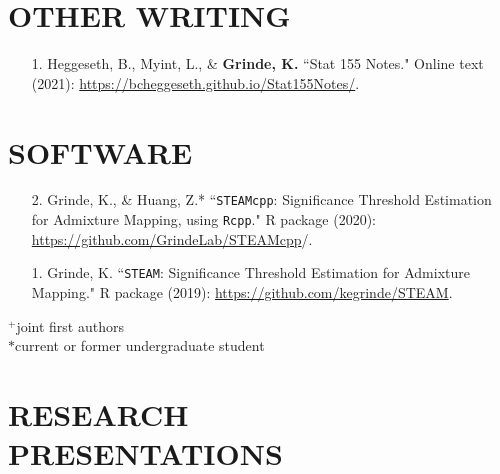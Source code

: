 \documentclass[margin]{res}
\newenvironment{benumerate}[1]{
    \let\oldItem\item
    \def\item{\addtocounter{enumi}{-2}\oldItem}
    
    \begin{enumerate}
    \setcounter{enumi}{#1}
    \addtocounter{enumi}{1}
}{
    \end{enumerate}
}
\begin{document}
\begin{resume}


\section{OTHER WRITING}

\begin{itemize}
\item[1.] Heggeseth, B., Myint, L., \& \textbf{Grinde, K.} ``Stat 155 Notes." Online text (2021): \href{https://bcheggeseth.github.io/Stat155Notes/}{https://bcheggeseth.github.io/Stat155Notes/}.
\end{itemize}

\section{SOFTWARE} 

\begin{itemize}
\item[2.] Grinde, K., \& Huang, Z.* ``\texttt{STEAMcpp}: Significance Threshold Estimation for Admixture Mapping, using \texttt{Rcpp}." R package (2020): \\ \href{https://github.com/GrindeLab/STEAMcpp}{https://github.com/GrindeLab/STEAMcpp}/.
\item[1.] Grinde, K. ``\texttt{STEAM}: Significance Threshold Estimation for Admixture Mapping." R package (2019): \href{https://github.com/kegrinde/STEAM}{https://github.com/kegrinde/STEAM}.
\end{itemize}
					
$^{+}$joint first authors\\
$*$current or former undergraduate student\\

\section{RESEARCH \\ PRESENTATIONS}


\end{resume}
\end{document}
